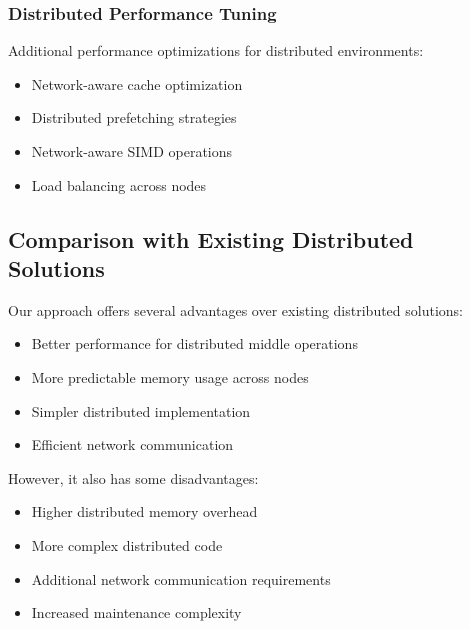\subsubsection{Distributed Performance Tuning}
Additional performance optimizations for distributed environments:
\begin{itemize}
    \item Network-aware cache optimization
    \item Distributed prefetching strategies
    \item Network-aware SIMD operations
    \item Load balancing across nodes
\end{itemize}

\subsection{Comparison with Existing Distributed Solutions}

Our approach offers several advantages over existing distributed solutions:
\begin{itemize}
    \item Better performance for distributed middle operations
    \item More predictable memory usage across nodes
    \item Simpler distributed implementation
    \item Efficient network communication
\end{itemize}

However, it also has some disadvantages:
\begin{itemize}
    \item Higher distributed memory overhead
    \item More complex distributed code
    \item Additional network communication requirements
    \item Increased maintenance complexity
\end{itemize} 